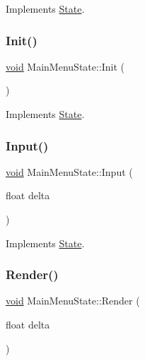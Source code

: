 Implements \hyperlink{classState_ade502eaa386d570e526eb356ffd73fd8}{State}.

\mbox{\label{classMainMenuState_afab2a9b829a8ef752fed701d5cd260f8}} 
\subsubsection{\texorpdfstring{Init()}{Init()}}
{\footnotesize\ttfamily \hyperlink{imgui__impl__opengl3__loader_8h_ac668e7cffd9e2e9cfee428b9b2f34fa7}{void} Main\+Menu\+State\+::\+Init (\begin{DoxyParamCaption}{ }\end{DoxyParamCaption})\hspace{0.3cm}{\ttfamily [virtual]}}



Implements \hyperlink{classState_a7ab4d8c6aa239a17ed579d89a209b156}{State}.

\mbox{\label{classMainMenuState_aa62c91d35b5b4a24c0a13c22020845e8}} 
\subsubsection{\texorpdfstring{Input()}{Input()}}
{\footnotesize\ttfamily \hyperlink{imgui__impl__opengl3__loader_8h_ac668e7cffd9e2e9cfee428b9b2f34fa7}{void} Main\+Menu\+State\+::\+Input (\begin{DoxyParamCaption}\item[{float}]{delta }\end{DoxyParamCaption})\hspace{0.3cm}{\ttfamily [virtual]}}



Implements \hyperlink{classState_a1705412877f37a5cc8fc712542756076}{State}.

\mbox{\label{classMainMenuState_af675ec319923f1cf22446808a7735dea}} 
\subsubsection{\texorpdfstring{Render()}{Render()}}
{\footnotesize\ttfamily \hyperlink{imgui__impl__opengl3__loader_8h_ac668e7cffd9e2e9cfee428b9b2f34fa7}{void} Main\+Menu\+State\+::\+Render (\begin{DoxyParamCaption}\item[{float}]{delta }\end{DoxyParamCaption})\hspace{0.3cm}{\ttfamily [virtual]}}



